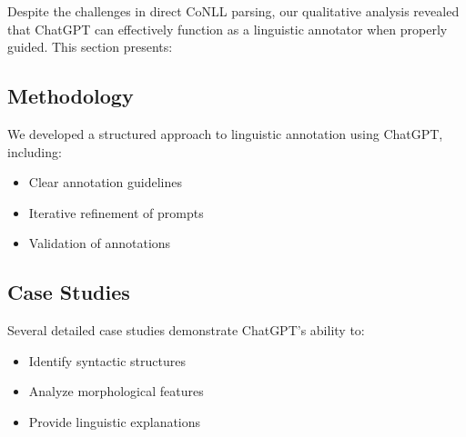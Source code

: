 Despite the challenges in direct CoNLL parsing, our qualitative analysis revealed that ChatGPT can effectively function as a linguistic annotator when properly guided. This section presents:

\subsection{Methodology}
We developed a structured approach to linguistic annotation using ChatGPT, including:
\begin{itemize}
    \item Clear annotation guidelines
    \item Iterative refinement of prompts
    \item Validation of annotations
\end{itemize}

\subsection{Case Studies}
Several detailed case studies demonstrate ChatGPT's ability to:
\begin{itemize}
    \item Identify syntactic structures
    \item Analyze morphological features
    \item Provide linguistic explanations
\end{itemize} 